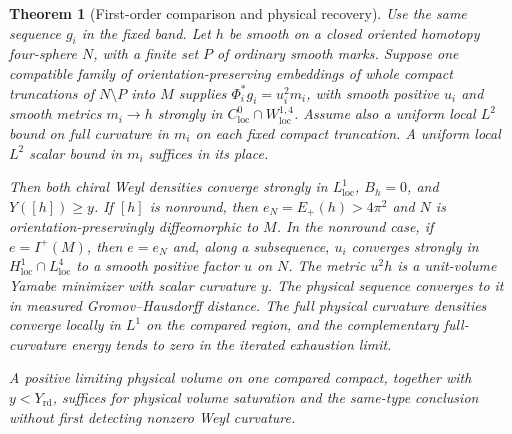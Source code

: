 \documentclass[11pt]{article}
\numberwithin{equation}{section}
\newtheorem{theorem}{Theorem}[section]
\theoremstyle{definition}
\theoremstyle{remark}
\newcommand{\rd}{\mathrm{rd}}
\begin{document}
\begin{theorem}[First-order comparison and physical recovery]\label{thm:marked-base}
Use the same sequence \(g_i\) in the fixed band. Let \(h\) be smooth
on a closed oriented homotopy four-sphere \(N\), with a finite set
\(P\) of ordinary smooth marks. Suppose one compatible family of
orientation-preserving embeddings of whole compact truncations of
\(N\setminus P\) into \(M\) supplies
\(\Phi_i^*g_i=u_i^2m_i\), with smooth positive \(u_i\) and smooth
metrics \(m_i\to h\) strongly in \(C^0_{\mathrm{loc}}\cap
W^{1,4}_{\mathrm{loc}}\). Assume also a uniform local \(L^2\) bound on
full curvature in \(m_i\) on each fixed compact truncation. A uniform
local \(L^2\) scalar bound in \(m_i\) suffices in its place.

Then both chiral Weyl densities converge strongly in \(L^1_{\mathrm{loc}}\),
\(B_h=0\), and \(Y([h])\ge y\). If \([h]\) is nonround,
then \(e_N=E_+(h)>4\pi^2\) and \(N\) is orientation-preservingly
diffeomorphic to \(M\). In the nonround case, if \(e=I^+(M)\),
then \(e=e_N\) and, along a subsequence, \(u_i\) converges strongly
in \(H^1_{\mathrm{loc}}\cap L^4_{\mathrm{loc}}\) to a smooth positive
factor \(u\) on \(N\). The metric \(u^2h\) is a unit-volume Yamabe
minimizer with scalar curvature \(y\). The physical sequence converges
to it in measured Gromov--Hausdorff distance. The full physical
curvature densities converge locally in \(L^1\) on the compared
region, and the complementary full-curvature energy tends to zero
in the iterated exhaustion limit.

A positive limiting physical volume on one compared compact,
together with \(y<Y_{\rd}\), suffices for physical volume saturation
and the same-type conclusion without first detecting nonzero Weyl
curvature.
\end{theorem}
\end{document}
